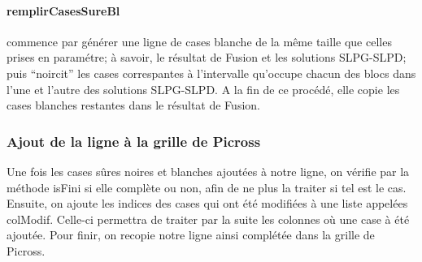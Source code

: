 \documentclass{article}
\begin{document}
\paragraph{remplirCasesSureBl} commence par g\'en\'erer une ligne de cases blanche de la m\^eme taille que celles prises en param\'etre; \`a savoir, le r\'esultat de Fusion et les solutions SLPG-SLPD; puis ``noircit'' les cases correspantes \`a l'intervalle qu'occupe chacun des blocs dans l'une et l'autre des solutions SLPG-SLPD.
\newline
A la fin de ce proc\'ed\'e, elle copie les cases blanches restantes dans le r\'esultat de Fusion.
\subsubsection{Ajout de la ligne \`a la grille de Picross}
Une fois les cases s\^ures noires et blanches ajout\'ees \`a notre ligne, on v\'erifie par la m\'ethode isFini si elle compl\`ete ou non, afin de ne plus la traiter si tel est le cas.
\newline
Ensuite, on ajoute les indices des cases qui ont \'et\'e modifi\'ees \`a une liste appel\'ees colModif. Celle-ci permettra de traiter par la suite les colonnes o\`u une case \`a \'et\'e ajout\'ee.
\newline
Pour finir, on recopie notre ligne ainsi compl\'et\'ee dans la grille de Picross.
\end{document}
